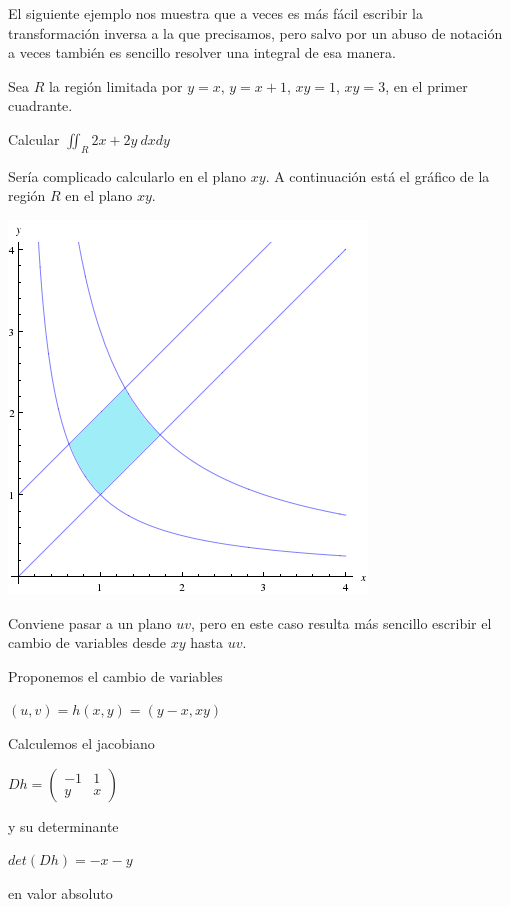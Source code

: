 El siguiente ejemplo nos muestra que a veces es más fácil escribir la transformación inversa a la que precisamos, pero salvo por un abuso de notación a veces también es sencillo resolver una integral de esa manera.

\begin{example}
Sea $R$ la región limitada por $y = x$, $y = x+1$, $xy=1$, $xy=3$, en el primer cuadrante.

Calcular $\iint_{R} 2x+2y \ dxdy$
\end{example}

Sería complicado calcularlo en el plano $xy$.  A continuación está el gráfico de la región $R$ en el plano $xy$.

\begin{center}
\includegraphics[scale=0.7]{images/04_analisis2/multiples.png}
\end{center}

Conviene pasar a un plano $uv$, pero en este caso resulta más sencillo escribir el cambio de variables desde $xy$ hasta $uv$.  

Proponemos el cambio de variables

$(u,v) = h(x,y) = (y-x, xy)$

Calculemos el jacobiano 

$Dh = \begin{pmatrix} -1 & 1 \\ y & x \end{pmatrix}$

y su determinante

$det(Dh) = -x - y$

en valor absoluto

